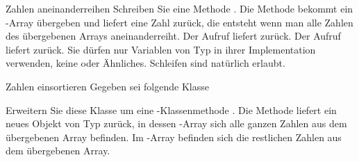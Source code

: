 \documentclass{../tuda-exercise}
\begin{document}
  \clearpagesolution

  \begin{task}[credit=\stars{2}{3}]{Zahlen aneinanderreihen}
    Schreiben Sie eine Methode . Die Methode
    bekommt ein -Array übergeben und liefert eine Zahl zurück, die entsteht wenn
    man alle Zahlen des übergebenen Arrays aneinanderreiht. Der Aufruf  liefert  zurück. Der Aufruf 
    liefert  zurück. Sie dürfen nur Variablen von Typ  in
    ihrer Implementation verwenden, keine  oder Ähnliches. Schleifen sind
    natürlich erlaubt.

    \begin{solution}
      
    \end{solution}
  \end{task}

  \clearpage

  \begin{task}[credit=\stars{2}{3}]{Zahlen einsortieren}
    Gegeben sei folgende Klasse

    

    Erweitern Sie diese Klasse um eine -Klassenmethode . Die Methode liefert ein neues Objekt von Typ 
    zurück, in dessen -Array sich alle ganzen Zahlen aus dem übergebenen Array
     befinden. Im -Array befinden sich die restlichen Zahlen
    aus dem übergebenen Array.

    \begin{solution}
      

      \clearpage

      
    \end{solution}
  \end{task}
\end{document}

